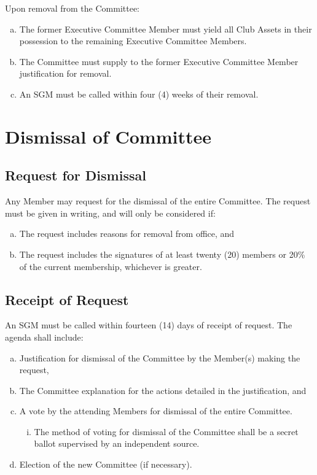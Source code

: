 \documentclass[a4paper,12pt]{article}
\begin{document}
Upon removal from the Committee:

\begin{enumerate}[a)]
	\item The former Executive Committee Member must yield all Club Assets in their possession to the remaining Executive Committee Members.
	\item The Committee must supply to the former Executive Committee Member justification for removal.
	\item An SGM must be called within four (4) weeks of their removal.
\end{enumerate}

\section{Dismissal of Committee}

\subsection{Request for Dismissal}

Any Member may request for the dismissal of the entire Committee. The request must be given in writing, and will only be considered if:

\begin{enumerate}[a)]
	\item The request includes reasons for removal from office, and
	\item The request includes the signatures of at least twenty (20) members or 20\% of the current membership, whichever is greater.
\end{enumerate}

\subsection{Receipt of Request}

An SGM must be called within fourteen (14) days of receipt of request. The agenda shall include:

\begin{enumerate}[a)]
	\item Justification for dismissal of the Committee by the Member(s) making the request,
	\item The Committee explanation for the actions detailed in the justification, and
	\item A vote by the attending Members for dismissal of the entire Committee.
	\begin{enumerate}[i)]
		\item The method of voting for dismissal of the Committee shall be a secret ballot supervised by an independent source.
	\end{enumerate}
	\item Election of the new Committee (if necessary).
\end{enumerate}
\end{document}
